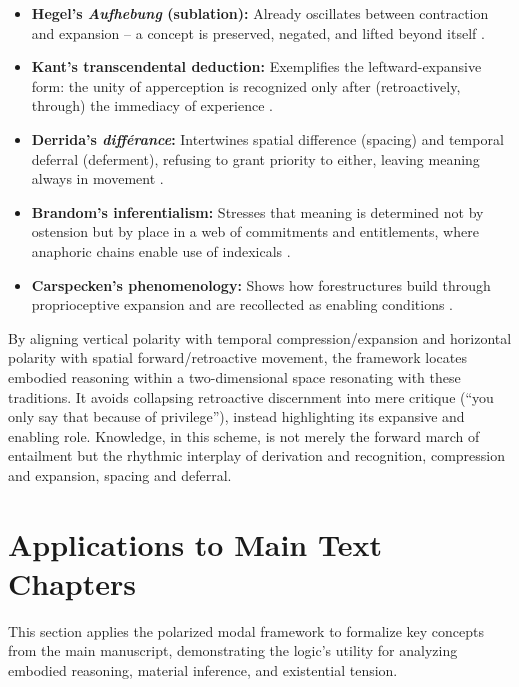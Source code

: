 \documentclass[12pt]{book}
\begin{document}
\begin{itemize}
\item \textbf{Hegel's \textit{Aufhebung} (sublation):} Already oscillates between contraction and expansion -- a concept is preserved, negated, and lifted beyond itself \parencite{hegel1977phenomenology}.

\item \textbf{Kant's transcendental deduction:} Exemplifies the leftward-expansive form: the unity of apperception is recognized only after (retroactively, through) the immediacy of experience \parencite{Kant1781}.

\item \textbf{Derrida's \textit{différance}:} Intertwines spatial difference (spacing) and temporal deferral (deferment), refusing to grant priority to either, leaving meaning always in movement \parencite{Derrida:1973}.

\item \textbf{Brandom's inferentialism:} Stresses that meaning is determined not by ostension but by place in a web of commitments and entitlements, where anaphoric chains enable use of indexicals \parencite{brandom1994making,Brandom2008}.

\item \textbf{Carspecken's phenomenology:} Shows how forestructures build through proprioceptive expansion and are recollected as enabling conditions \parencite{Carspecken1999}.
\end{itemize}

By aligning vertical polarity with temporal compression/expansion and horizontal polarity with spatial forward/retroactive movement, the framework locates embodied reasoning within a two-dimensional space resonating with these traditions. It avoids collapsing retroactive discernment into mere critique (``you only say that because of privilege''), instead highlighting its expansive and enabling role. Knowledge, in this scheme, is not merely the forward march of entailment but the rhythmic interplay of derivation and recognition, compression and expansion, spacing and deferral.

\section{Applications to Main Text Chapters}

This section applies the polarized modal framework to formalize key concepts from the main manuscript, demonstrating the logic's utility for analyzing embodied reasoning, material inference, and existential tension.
\end{document}

